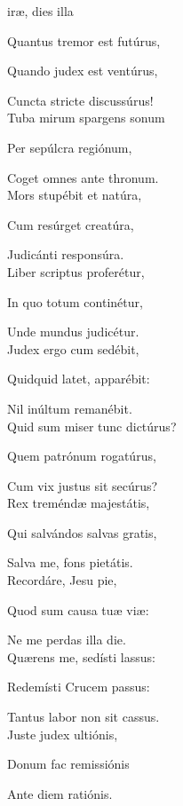 { ir{\ae}, dies illa\par
{}
Quantus tremor est futúrus,

Quando judex est ventúrus,

Cuncta stricte discussúrus!\\

Tuba mirum spargens sonum

Per sepúlcra regiónum,

Coget omnes ante thronum.\\

Mors stupébit et natúra,

Cum resúrget creatúra,

Judicánti responsúra.\\

Liber scriptus proferétur,

In quo totum continétur,

Unde mundus judicétur.\\

Judex ergo cum sedébit,

Quidquid latet, apparébit:

Nil inúltum remanébit.\\

Quid sum miser tunc dictúrus?

Quem patrónum rogatúrus,

Cum vix justus sit secúrus?\\

Rex treménd{\ae} majestátis,

Qui salvándos salvas gratis,

Salva me, fons pietátis.\\

Recordáre, Jesu pie,

Quod sum causa tu{\ae} vi{\ae}:

Ne me perdas illa die.\\

Qu{\ae}rens me, sedísti lassus:

Redemísti Crucem passus:

Tantus labor non sit cassus.\\

Juste judex ultiónis,

Donum fac remissiónis

Ante diem ratiónis.\\

}
